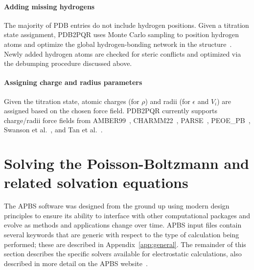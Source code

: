 \documentclass[12pt,titlepage]{article}
\begin{document}
\paragraph{Adding missing hydrogens}
The majority of PDB entries do not include hydrogen positions.
Given a titration state assignment, PDB2PQR uses Monte Carlo sampling to position hydrogen atoms and optimize the global hydrogen-bonding network in the structure~\cite{Nielsen2001}.
Newly added hydrogen atoms are checked for steric conflicts and optimized via the debumping procedure discussed above.

\paragraph{Assigning charge and radius parameters} 
Given the tit\-rat\-ion state, atomic charges (for $\rho$) and radii (for $\epsilon$ and $V_i$) are assigned based on the chosen force field.
PDB2PQR currently supports charge/radii force fields from AMBER99~\cite{AMBER99}, CHARMM22~\cite{MacKerell2004}, PARSE~\cite{Sitkoff1994}, PEOE\_PB~\cite{Czodrowski2006}, Swanson et al.~\cite{Swanson2005a}, and Tan et al.~\cite{Tan2006}.

\section{Solving the Poisson-Boltzmann and related solvation equations} \label{sec:apbs}
The APBS software was designed from the ground up using modern design principles to ensure its ability to interface with other computational packages and evolve as methods and applications change over time.
APBS input files contain several keywords that are generic with respect to the type of calculation being performed; these are described in Appendix~\ref{app:general}.
The remainder of this section describes the specific solvers available for electrostatic calculations, also described in more detail on the APBS website~\cite{APBSweb}.
\end{document}
